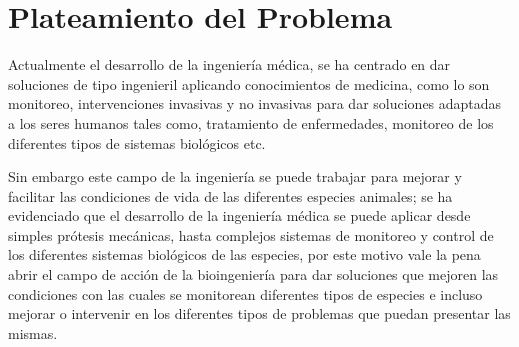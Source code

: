 \chapter{Plateamiento del Problema}

Actualmente el desarrollo de la ingeniería médica, se ha centrado en dar soluciones 
de tipo ingenieril aplicando conocimientos de medicina, como lo son monitoreo, intervenciones 
invasivas y no invasivas para dar soluciones adaptadas a los seres humanos tales como, 
tratamiento de enfermedades, monitoreo de los diferentes tipos de sistemas biológicos etc. 

Sin embargo este campo de la ingeniería se puede trabajar para mejorar y facilitar las 
condiciones de vida de las diferentes especies animales; se ha evidenciado que el desarrollo 
de la ingeniería médica  se puede aplicar desde simples prótesis mecánicas, hasta complejos 
sistemas de monitoreo y control de los diferentes sistemas biológicos de las especies, 
por este motivo vale la pena abrir el campo de acción de la bioingeniería para dar soluciones 
que mejoren las condiciones con las cuales se monitorean diferentes tipos de especies e incluso 
mejorar o intervenir en los diferentes tipos de problemas que puedan presentar las mismas.



